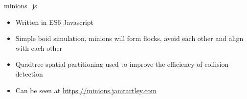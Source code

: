 \item minions\_js
\begin{itemize}
    \item Written in ES6 Javascript
    \item Simple boid simulation, minions will form flocks, avoid each other and align with each other
    \item Quadtree spatial partitioning used to improve the efficiency of collision detection
    \item Can be seen at \href{https://minions.jamtartley.com}{https://minions.jamtartley.com}
\end{itemize}
\bigbreak
